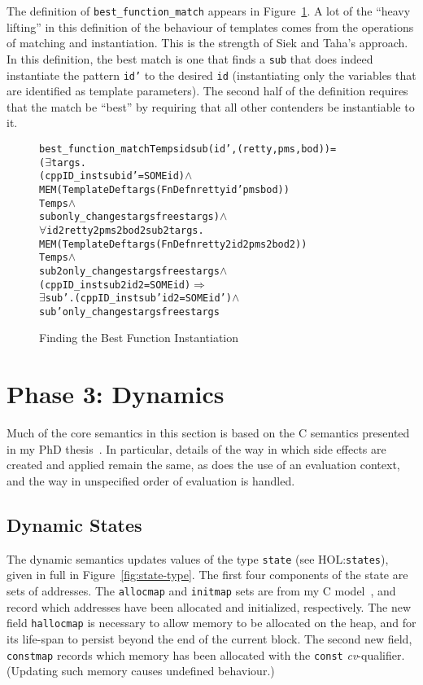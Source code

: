 \documentclass[11pt]{article}
\newcommand{\HOLfile}[1]{HOL:\texttt{#1}}
\begin{document}
The definition of \texttt{best_function_match} appears in
Figure~\ref{fig:best-function-match}.  A lot of the ``heavy lifting''
in this definition of the behaviour of templates comes from the
operations of matching and instantiation.  This is the strength of
Siek and Taha's approach.  In this definition, the best match is one
that finds a \texttt{sub} that does indeed instantiate the pattern
\texttt{id'} to the desired \texttt{id} (instantiating only the
variables that are identified as template parameters).  The second
half of the definition requires that the match be ``best'' by
requiring that all other contenders be instantiable to it.
\begin{figure}[htbp]
\begin{alltt}
   best_function_match Temps id sub (id', (retty,pms,bod)) =
     (\(\exists\)targs.
         (cppID_inst sub id' = SOME id) \(\land\)
         MEM (TemplateDef targs (FnDefn retty id' pms bod))
             Temps \(\land\)
         sub only_changes targsfrees targs) \(\land\)
     \(\forall\)id2 retty2 pms2 bod2 sub2 targs.
         MEM (TemplateDef targs (FnDefn retty2 id2 pms2 bod2))
             Temps \(\land\)
         sub2 only_changes targsfrees targs \(\land\)
         (cppID_inst sub2 id2 = SOME id) \(\Rightarrow\)
         \(\exists\)sub'. (cppID_inst sub' id2 = SOME id') \(\land\)
                sub' only_changes targsfrees targs
\end{alltt}
\caption{Finding the Best Function Instantiation}
\label{fig:best-function-match}
\end{figure}


\section{Phase 3: Dynamics}
\label{sec:phase3}

Much of the core semantics in this section is based on the C semantics
presented in my PhD thesis~\cite{Norrish98}.  In particular, details
of the way in which side effects are created and applied remain the
same, as does the use of an evaluation context, and the way in
unspecified order of evaluation is handled.

\subsection{Dynamic States}
\label{sec:dynamic-states}

The dynamic semantics updates values of the type \texttt{state} (see
\HOLfile{states}), given in full in Figure~\ref{fig:state-type}.  The
first four components of the state are sets of addresses.  The
\texttt{allocmap} and \texttt{initmap} sets are from my C
model~\cite{Norrish98}, and record which addresses have been allocated
and initialized, respectively.  The new field \texttt{hallocmap} is
necessary to allow memory to be allocated on the heap, and for its
life-span to persist beyond the end of the current block.  The second
new field, \texttt{constmap} records which memory has been allocated
with the \texttt{const} \emph{cv}-qualifier.  (Updating such memory
causes undefined behaviour.)
\end{document}
